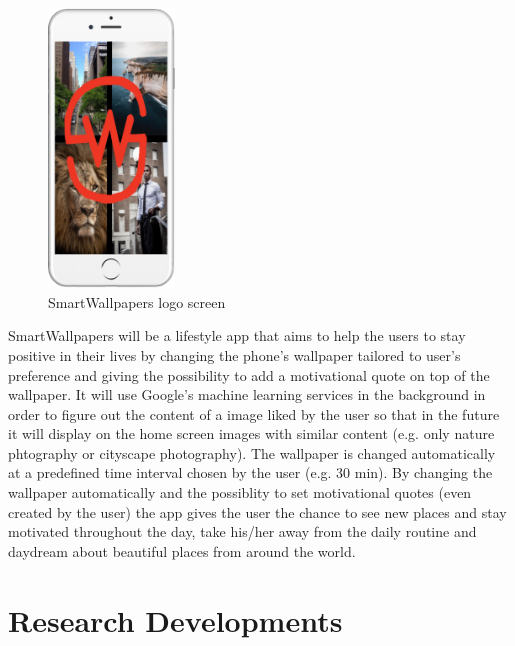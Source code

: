 \documentclass[version=last,fontsize=13pt]{scrartcl}
\begin{document}
\begin{figure}

	\centering

	\includegraphics[width = 0.3\textwidth]{imgs/sw_splash.png}

	\caption{SmartWallpapers logo screen}

\end{figure}

SmartWallpapers will be a lifestyle app that aims to help the users to stay positive in their lives by changing the phone’s wallpaper tailored to user’s preference and giving the possibility to add a motivational quote on top of the wallpaper. It will use Google’s machine learning services in the background in order to figure out the content of a image liked by the user so that in the future it will display on the home screen images with similar content (e.g. only nature phtography or cityscape photography). The wallpaper is changed automatically at a predefined time interval chosen by the user (e.g. 30 min). By changing the wallpaper automatically and the possiblity to set motivational quotes (even created by the user) the app gives the user the chance to see new places and stay motivated throughout the day, take his/her away from the daily routine and daydream about beautiful places from around the world.


\section{Research Developments }
\end{document}

